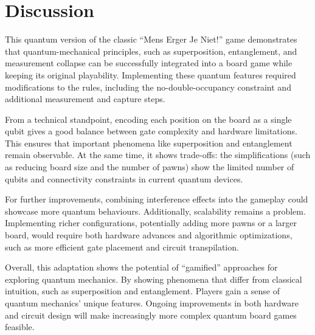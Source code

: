 \documentclass[final,5p,times,twocolumn,authoryear]{elsarticle}
\begin{document}
\section{Discussion}\label{discussion}
This quantum version of the classic “Mens Erger Je Niet!” game demonstrates that quantum-mechanical principles, such as superposition, entanglement, and measurement collapse can be successfully integrated into a board game while keeping its original playability. Implementing these quantum features required modifications to the rules, including the no-double-occupancy constraint and additional measurement and capture steps.

From a technical standpoint, encoding each position on the board as a single qubit gives a good balance between gate complexity and hardware limitations. This ensures that important phenomena like superposition and entanglement remain observable. At the same time, it shows trade-offs: the simplifications (such as reducing board size and the number of pawns) show the limited number of qubits and connectivity constraints in current quantum devices.

For further improvements, combining interference effects into the gameplay could showcase more quantum behaviours. Additionally, scalability remains a problem. Implementing richer configurations, potentially adding more pawns or a larger board, would require both hardware advances and algorithmic optimizations, such as more efficient gate placement and circuit transpilation.

Overall, this adaptation shows the potential of “gamified” approaches for exploring quantum mechanics. By showing phenomena that differ from classical intuition, such as superposition and entanglement. Players gain a sense of quantum mechanics’ unique features. Ongoing improvements in both hardware and circuit design will make increasingly more complex quantum board games feasible.

\end{document}
